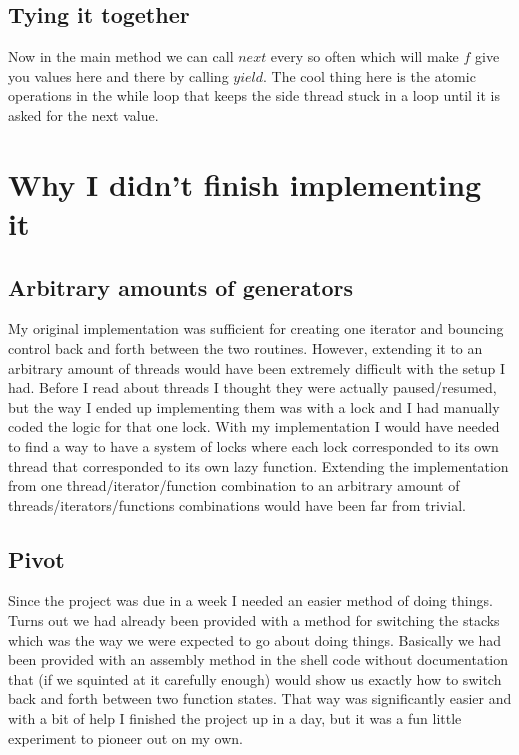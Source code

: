 \documentclass[12pt]{article}
\begin{document}
    \subsection{Tying it together}

    Now in the main method we can call $next$ every so often which will make $f$ give you values here and there by calling $yield$. The cool thing here is the atomic operations in the while loop that keeps the side thread stuck in a loop until it is asked for the next value. 

  \section{Why I didn't finish implementing it}
    \subsection{Arbitrary amounts of generators}
      My original implementation was sufficient for creating one iterator and bouncing control back and forth between the two routines. However, extending it to an arbitrary amount of threads would have been extremely difficult with the setup I had. Before I read about threads I thought they were actually paused/resumed, but the way I ended up implementing them was with a lock and I had manually coded the logic for that one lock. With my implementation I would have needed to find a way to have a system of locks where each lock corresponded to its own thread that corresponded to its own lazy function. Extending the implementation from one thread/iterator/function combination to an arbitrary amount of threads/iterators/functions combinations would have been far from trivial. 

    \subsection{Pivot}

    Since the project was due in a week I needed an easier method of doing things. Turns out we had already been provided with a method for switching the stacks which was the way we were expected to go about doing things. Basically we had been provided with an assembly method in the shell code without documentation that (if we squinted at it carefully enough) would show us exactly how to switch back and forth between two function states. That way was significantly easier and with a bit of help I finished the project up in a day, but it was a fun little experiment to pioneer out on my own.
\end{document}
